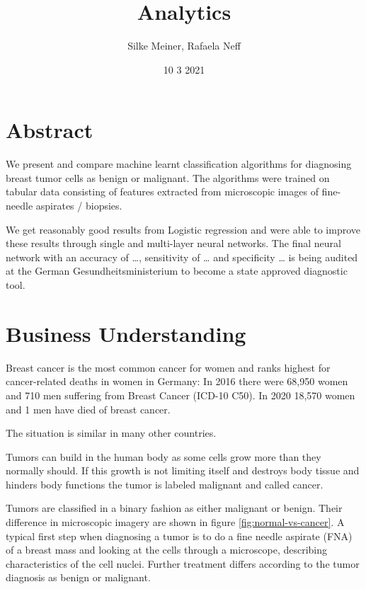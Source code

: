 \documentclass[]{article}
\title{Analytics}
\author{Silke Meiner, Rafaela Neff}
\date{10 3 2021}
\begin{document}
\maketitle

{
\setcounter{tocdepth}{2}
\tableofcontents
}
\section{Abstract}\label{abstract}

We present and compare machine learnt classification algorithms for
diagnosing breast tumor cells as benign or malignant. The algorithms
were trained on tabular data consisting of features extracted from
microscopic images of fine-needle aspirates / biopsies.

We get reasonably good results from Logistic regression and were able to
improve these results through single and multi-layer neural networks.
The final neural network with an accuracy of \ldots{}, sensitivity of
\ldots{} and specificity \ldots{} is being audited at the German
Gesundheitsministerium to become a state approved diagnostic tool.

\section{Business Understanding}\label{business-understanding}

Breast cancer is the most common cancer for women and ranks highest for
cancer-related deaths in women in Germany: In 2016 there were 68,950
women and 710 men suffering from Breast Cancer (ICD-10 C50). In 2020
18,570 women and 1 men have died of breast cancer.

The situation is similar in many other countries.

Tumors can build in the human body as some cells grow more than they
normally should. If this growth is not limiting itself and destroys body
tissue and hinders body functions the tumor is labeled malignant and
called cancer.

Tumors are classified in a binary fashion as either malignant or benign.
Their difference in microscopic imagery are shown in figure
\ref{fig:normal-vs-cancer}. A typical first step when diagnosing a tumor
is to do a fine needle aspirate (FNA) of a breast mass and looking at
the cells through a microscope, describing characteristics of the cell
nuclei. Further treatment differs according to the tumor diagnosis as
benign or malignant.
\end{document}
